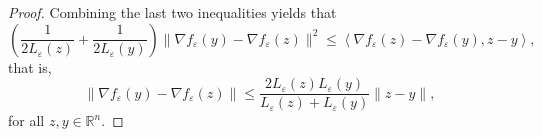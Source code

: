 \documentclass[11pt]{article}
\numberwithin{equation}{section}
\newtheorem{lemma}{Lemma}[proposition]
\begin{document}
\begin{proof}
Combining the last two inequalities yields that
\begin{equation*}
	\left( \frac{1}{2 L_{\varepsilon}(z)} + \frac{1}{2 L_{\varepsilon}(y)} \right) \| \nabla f_{\varepsilon}(y) - \nabla f_{\varepsilon}(z) \|^2 \leq \left\langle \nabla f_{\varepsilon}(z) - \nabla f_{\varepsilon}(y), z - y \right\rangle ,
\end{equation*}
that is, 
\begin{equation*}
	\| \nabla f_{\varepsilon}(y) - \nabla f_{\varepsilon}(z) \| \leq \frac{2L_{\varepsilon}(z)L_{\varepsilon}(y)}{L_{\varepsilon}(z) + L_{\varepsilon}(y)} \|z - y\| ,
\end{equation*}
for all $z,y \in \mathbb{R}^n$.
\end{proof}

%
%
\end{document}
